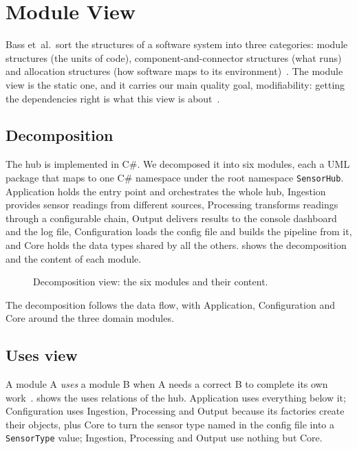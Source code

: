 \documentclass[../main-en.tex]{subfiles}
\begin{document}
\section{Module View}
\label{sec:module-view}

\setcounter{topnumber}{3}
\setcounter{totalnumber}{5}
\renewcommand{\topfraction}{0.9}
\renewcommand{\floatpagefraction}{0.85}

Bass et~al.\ sort the structures of a software system into three categories:
module structures (the units of code), component-and-connector structures
(what runs) and allocation structures (how software maps to its
environment)~\cite{bass_software_2021}. The module view is the static one, and it carries our main quality goal,
modifiability: getting the dependencies right is what this view is
about~\cite{wiklund_ch8_nodate}.

\subsection{Decomposition}

The hub is implemented in C\#. We decomposed it into six modules, each a
UML package that maps to one C\# namespace under the root namespace
\texttt{SensorHub}. Application holds the entry point and orchestrates the
whole hub, Ingestion provides sensor readings from different sources,
Processing transforms readings through a configurable chain, Output delivers
results to the console dashboard and the log file, Configuration loads the
config file and builds the pipeline from it, and Core holds the data types
shared by all the others.  shows the decomposition and
the content of each module.

\begin{figure}[htbp]
  \centering
  \caption{Decomposition view: the six modules and their content.}
  \label{fig:module-view}
\end{figure}

The decomposition follows the data flow, with Application, Configuration
and Core around the three domain modules.

\subsection{Uses view}

A module A \emph{uses} a module B when A needs a correct B to complete its
own work~\cite{bass_software_2021}.  shows the uses
relations of the hub. Application uses everything below it; Configuration
uses Ingestion, Processing and Output because its factories create their
objects, plus Core to turn the sensor type named in the config file into a
\texttt{SensorType} value; Ingestion, Processing and Output use nothing but
Core.
\end{document}
